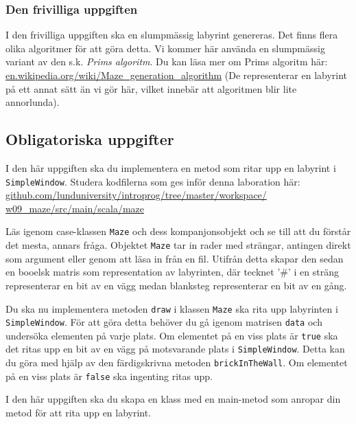 \subsubsection{Den frivilliga uppgiften}

I den frivilliga uppgiften ska en slumpmässig labyrint genereras. Det finns flera olika algoritmer för att göra detta. Vi kommer här använda en slumpmässig variant av den s.k. \emph{Prims algoritm}. Du kan läsa mer om Prims algoritm här: \href{https://en.wikipedia.org/wiki/Maze_generation_algorithm}{en.wikipedia.org/wiki/Maze\_generation\_algorithm} (De representerar en labyrint på ett annat sätt än vi gör här, vilket innebär att algoritmen blir lite annorlunda).


\subsection{Obligatoriska uppgifter}

\Task I den här uppgiften ska du implementera en metod som ritar upp en labyrint i \texttt{SimpleWindow}. Studera kodfilerna som ges inför denna laboration här: 
\href{https://github.com/lunduniversity/introprog/tree/master/workspace/w09_maze/src/main/scala/maze}{github.com/lunduniversity/introprog/tree/master/workspace/\\w09\_maze/src/main/scala/maze}

Läs igenom case-klassen \texttt{Maze} och dess kompanjonsobjekt och se till att du förstår det mesta, annars fråga. Objektet \texttt{Maze} tar in rader med strängar, antingen direkt som argument eller genom att läsa in från en fil. Utifrån detta skapar den sedan en booelsk matris som representation av labyrinten, där tecknet '\#' i en sträng representerar en bit av en vägg medan blanksteg representerar en bit av en gång.

\Subtask Du ska nu implementera metoden \texttt{draw} i klassen \texttt{Maze} ska rita upp labyrinten i \texttt{SimpleWindow}. För att göra detta behöver du gå igenom matrisen \texttt{data} och undersöka elementen på varje plats. Om elementet på en viss plats är \texttt{true} ska det ritas upp en bit av en vägg på motsvarande plats i \texttt{SimpleWindow}. Detta kan du göra med hjälp av den färdigskrivna metoden \texttt{brickInTheWall}. Om elementet på en viss plats är \texttt{false} ska ingenting ritas upp.


\Task I den här uppgiften ska du skapa en klass med en main-metod som anropar din metod för att rita upp en labyrint.

